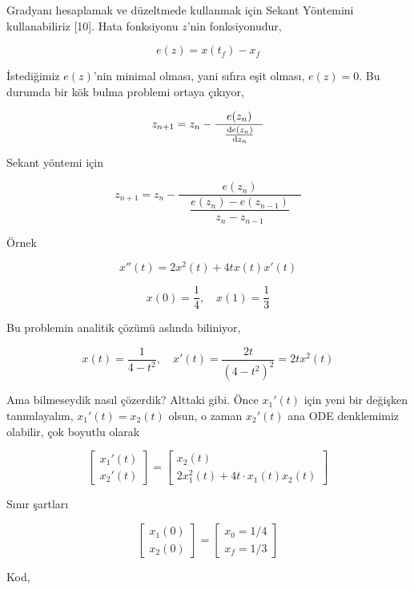 \documentclass[12pt,fleqn]{article}\usepackage{../../common}
\begin{document}
Gradyanı hesaplamak ve düzeltmede kullanmak için Sekant Yöntemini
kullanabiliriz [10]. Hata fonksiyonu $z$'nin fonksiyonudur,

$$ e(z) = x(t_f) - x_f $$

İstediğimiz $e(z)$'nin minimal olması, yani sıfıra eşit olması, $e(z) =
0$. Bu durumda bir kök bulma problemi ortaya çıkıyor,

$$ z_{n+1} = z_n - \frac{ \quad e(z_n) \quad }{\frac{\,\mathrm{d} e(z_n) }{\,\mathrm{d} z_n} }$$

Sekant yöntemi için

$$ z_{n+1} = z_n - 
\frac{ e(z_n)  }{\quad \dfrac{e(z_n) - e(z_{n-1})}{z_n - z_{n-1}} \quad }
$$

Örnek 

$$ x''(t) = 2x^2(t) + 4t x(t) x'(t)$$

$$ x(0) = \frac{1}{4}, \quad x(1) = \frac{1}{3}$$

Bu problemin analitik çözümü aslında biliniyor, 

$$x(t) = \frac{1}{4 - t^2}, \quad x'(t) = \frac{2t}{(4-t^2)^2} = 2t x^2(t)$$

Ama bilmeseydik nasıl çözerdik? Alttaki gibi. Önce $x_1'(t)$ için yeni bir
değişken tanımlayalım, $x_1'(t) = x_2(t)$ olsun, o zaman $x_2'(t)$ ana ODE
denklemimiz olabilir, çok boyutlu olarak

$$ 
\left[\begin{array}{c}
x_1'(t) \\ x_2'(t) 
\end{array}\right] 
=
\left[\begin{array}{c}
x_2(t) \\
2x_1^2(t) + 4t \cdot x_1(t)x_2(t)
\end{array}\right] 
$$

Sınır şartları

$$ 
\left[\begin{array}{c}
x_1(0) \\ x_2(0)
\end{array}\right]
=
\left[\begin{array}{c}
x_0 = 1/4 \\ x_f = 1/3
\end{array}\right]
$$

Kod, 
\end{document}
